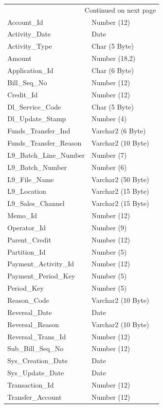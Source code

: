 \documentclass[12pt,twoside]{article}
\begin{document}
\begin{longtable}{l|l|l}
\hline
\endhead
\hline\multicolumn{3}{r}{Continued on next page} \\
\endfoot
\endlastfoot
\hline
Account\_Id & Number (12) & \\
Activity\_Date & Date & \\
Activity\_Type & Char (5 Byte) & \\
Amount & Number (18,2) & \\
Application\_Id & Char (6 Byte) & \\
Bill\_Seq\_No & Number (12) & \\
Credit\_Id & Number (12) & \\
Dl\_Service\_Code & Char (5 Byte) & \\
Dl\_Update\_Stamp & Number (4) & \\
Funds\_Transfer\_Ind & Varchar2 (6 Byte) & \\
Funds\_Transfer\_Reason & Varchar2 (10 Byte) & \\
L9\_Batch\_Line\_Number & Number (7) & \\
L9\_Batch\_Number & Number (6) & \\
L9\_File\_Name & Varchar2 (50 Byte) & \\
L9\_Location & Varchar2 (15 Byte) & \\
L9\_Sales\_Channel & Varchar2 (15 Byte) & \\
Memo\_Id & Number (12) & \\
Operator\_Id & Number (9) & \\
Parent\_Credit & Number (12) & \\
Partition\_Id & Number (5) & \\
Payment\_Activity\_Id & Number (12) & \\
Payment\_Period\_Key & Number (5) & \\
Period\_Key & Number (5) & \\
Reason\_Code & Varchar2 (10 Byte) & \\
Reversal\_Date & Date & \\
Reversal\_Reason & Varchar2 (10 Byte) & \\
Reversal\_Trans\_Id & Number (12) & \\
Sub\_Bill\_Seq\_No & Number (12) & \\
Sys\_Creation\_Date & Date & \\
Sys\_Update\_Date & Date & \\
Transaction\_Id & Number (12) & \\
Transfer\_Account & Number (12) & \\
\hline
\end{longtable}
\end{document}
